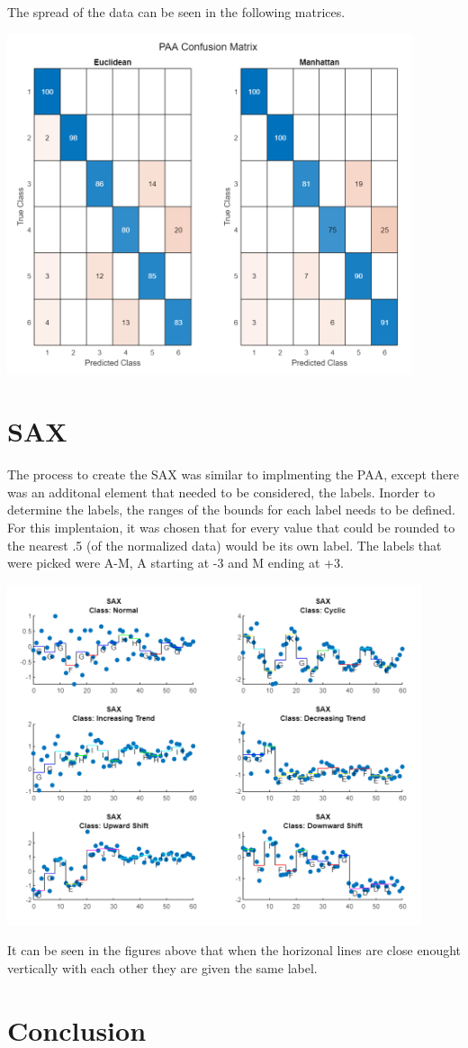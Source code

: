 \documentclass{article}
\begin{document}
The spread of the data can be seen in the following matrices.
\begin{center}
    {\includegraphics[height=10cm]{graphics/confusedpaa.png}\centering}
\end{center}


\section{SAX}
The process to create the SAX was similar to implmenting the PAA, except there
was an additonal element that needed to be considered, the labels.  Inorder to
determine the labels, the ranges of the bounds for each label needs to be defined.
For this implentaion, it was chosen that for every value that could be rounded 
to the nearest .5 (of the normalized data) would be its own label.  The labels
that were picked were A-M, A starting at -3 and M ending at +3. 

\begin{center}
    {\includegraphics[height=10cm]{graphics/saxplot.png}\centering}
\end{center}

It can be seen in the figures above that when the horizonal lines are close 
enought vertically with each other they are given the same label.

\section{Conclusion}
\end{document}
